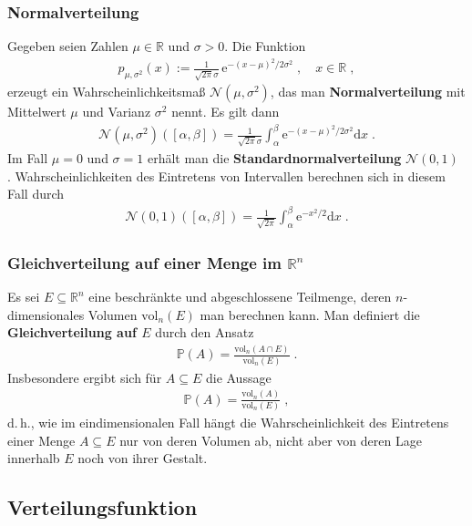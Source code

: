 \documentclass[ngerman,draft,parskip=half,twoside]{scrartcl}
\newcommand*{\R}{\mathbb{R}}      %
\newcommand*{\WKM}{\mathbb{P}}      %
\begin{document}
\subsubsection{Normalverteilung}
Gegeben seien Zahlen $\mu\in\R$ und $\sigma>0$. Die
Funktion
\begin{gather*}
  p_{\mu,\sigma^2}(x):= \frac{1}{\sqrt{2\pi}\sigma}\,\mathrm e^{-(x-\mu)^2/2\sigma^2}\;,
     \quad x\in\R\;,
\end{gather*}
erzeugt ein Wahrscheinlichkeitsmaß $\mathcal N(\mu,\sigma^2)$, das
man \textbf{Normalverteilung} mit Mittelwert $\mu$ und Varianz $\sigma^2$ nennt. Es gilt dann
\begin{gather*}
  \mathcal N(\mu,\sigma^2)([\alpha,\beta])=\frac{1}{\sqrt{2\pi}\sigma}
     \int_\alpha^\beta \mathrm e^{-(x-\mu)^2/2\sigma^2}\mathrm dx\;.
\end{gather*}
Im Fall $\mu=0$ und $\sigma=1$ erhält man die \textbf{Standardnormalverteilung}
$\mathcal N(0,1)$ . Wahrscheinlichkeiten des Eintretens von Intervallen berechnen sich in diesem Fall durch
\begin{gather*}
  \mathcal N(0,1)([\alpha,\beta])=\frac{1}{\sqrt{2\pi}}
     \int_\alpha^\beta \mathrm e^{-x^2/2}\mathrm dx\;.
\end{gather*}

\subsubsection{Gleichverteilung auf einer Menge im $\R^n$}
Es sei $E\subseteq \R^n$ eine beschränkte und abgeschlossene
Teilmenge, deren $n$-dimensionales Volumen $\mathrm{vol}_n(E)$ man
berechnen kann. Man definiert die \textbf{Gleichverteilung auf $E$} durch den Ansatz
\begin{gather*}
  \WKM(A)=\frac{\mathrm{vol}_n(A\cap E)}{\mathrm{vol}_n(E)}\;.
\end{gather*}
Insbesondere ergibt sich für $A\subseteq E$ die Aussage
\begin{gather*}
  \WKM(A)=\frac{\mathrm{vol}_n(A)}{\mathrm{vol}_n(E)}\;,
\end{gather*}
d.\,h., wie im eindimensionalen Fall hängt die Wahrscheinlichkeit des Eintretens einer Menge $A\subseteq E$
nur von deren Volumen ab, nicht aber von deren Lage innerhalb $E$ noch von ihrer Gestalt.
\subsection{Verteilungsfunktion}
\end{document}
